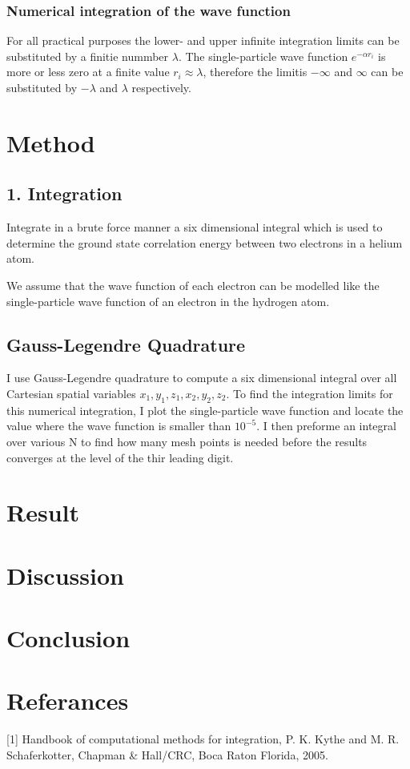 \documentclass[%
reprint,
amsmath,amssymb,
aps,
]{revtex4-1}
\begin{document}
\subsubsection*{Numerical integration of the wave function}
For all practical purposes the lower- and upper infinite integration limits can be substituted by a finitie nummber $\lambda$. The single-particle wave function $e^{-\alpha r_i}$ is more or less zero at a finite value $r_i\approx \lambda$, therefore the limitis $-\infty$ and $\infty$ can be substituted by $-\lambda$ and $\lambda$ respectively. 
\vspace{10mm}
\section{Method}
\subsection{1. Integration}
Integrate in a brute force manner a six dimensional integral which is used to determine the ground state correlation energy between two electrons in a helium atom. 

We assume that the wave function of each electron can be modelled like the single-particle wave function of an electron in the hydrogen atom. 

\subsection*{Gauss-Legendre Quadrature}
I use Gauss-Legendre quadrature to compute a six dimensional integral over all Cartesian spatial variables $x_1, y_1, z_1, x_2,y_2,z_2$. To find the integration limits for this numerical integration, I plot the single-particle wave function and locate the value where the wave function is smaller than $10^{-5}$. I then preforme an integral over various N to find how many mesh points is needed before the results converges at the level of the thir leading digit. 

\section{Result}
\section{Discussion}
\section{Conclusion }

\section{Referances}
[1] Handbook of computational methods for integration, P. K. Kythe and M. R. Schaferkotter, Chapman \& Hall/CRC, Boca Raton Florida, 2005.
\end{document}
